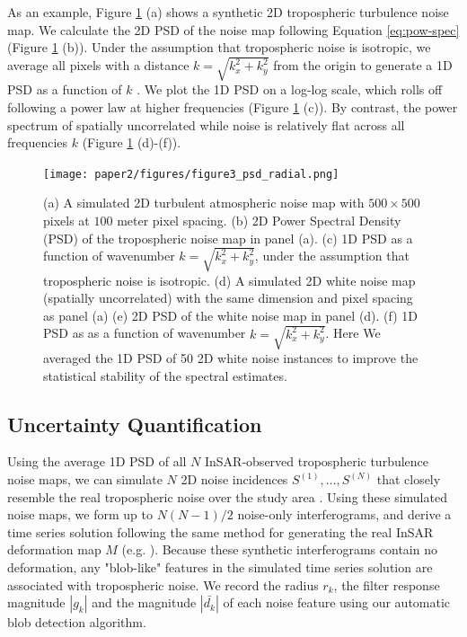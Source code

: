 	
	As an example, Figure \ref{fig:psd-example} (a) shows a synthetic 2D tropospheric turbulence noise map. We calculate the 2D PSD of the noise map following Equation \eqref{eq:pow-spec} (Figure \ref{fig:psd-example} (b)). Under the assumption that tropospheric noise is isotropic, we average all pixels with a distance  $k= \sqrt{k_x^2 + k_y^2}$ from the origin to generate a 1D PSD as a function of $k$ \cite{Hanssen2001RadarInterferometryData}.
	We plot the 1D PSD on a log-log scale, which rolls off following a power law at higher frequencies (Figure \ref{fig:psd-example} (c)). By contrast, the power spectrum of spatially uncorrelated while noise is relatively flat across all frequencies $k$ (Figure \ref{fig:psd-example} (d)-(f)).
	
	
	
	
	\begin{figure}
		\centering 
		\texttt{[image: paper2/figures/figure3\_psd\_radial.png]}
		\caption[Example 1D tropospheric PSD estimation]{
			(a) A simulated 2D turbulent atmospheric noise map with $ 500 \times 500 $ pixels at $100$ meter pixel spacing.
			(b) 2D Power Spectral Density (PSD) of the tropospheric noise map in panel (a).
			(c) 1D PSD as a function of wavenumber $k = \sqrt{k_x^2 + k_y^2}$, under the assumption that tropospheric noise is isotropic.
			(d) A simulated 2D white noise map (spatially uncorrelated) with the same dimension and pixel spacing as panel (a)
			(e) 2D PSD of the white noise map in panel (d).
			(f) 1D PSD as as a function of wavenumber $k = \sqrt{k_x^2 + k_y^2}$. Here We averaged the 1D PSD of 50 2D white noise instances to improve the statistical stability of the spectral estimates.
		}
		\label{fig:psd-example}
	\end{figure}
	
	
	\subsection{Uncertainty Quantification}
	\label{subsec:methods-3-noise-sim}
	
	Using the average 1D PSD of all $N$ InSAR-observed tropospheric turbulence noise maps, we can simulate $N$ 2D noise incidences  $S^{(1)},\dots, S^{(N)} $ that closely resemble the real tropospheric noise over the study area \cite{Hanssen2001RadarInterferometryData}. Using these simulated noise maps, we form up to $N(N-1)/2$ noise-only interferograms, and derive a time series solution following the same method for generating the real InSAR deformation map $M$ (e.g. \cite{Sandwell1998PhaseGradientApproach, Berardino2002NewAlgorithmSurface}). Because these synthetic interferograms contain no deformation, any "blob-like" features in the simulated time series solution are associated with tropospheric noise. We record the radius $r_k$,  the filter response magnitude $|g_k|$ and the magnitude $|\bar{d_k}|$ of each noise feature using our automatic blob detection algorithm.
	
